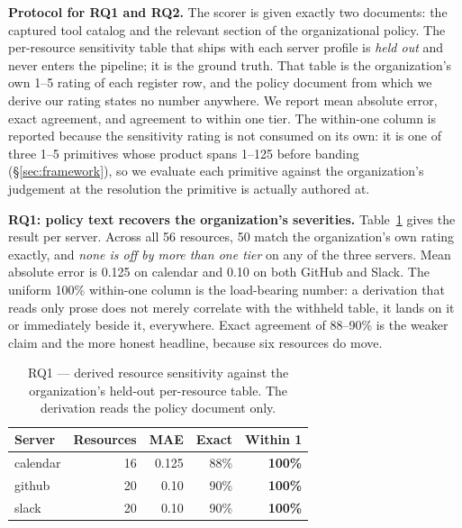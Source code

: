 \textbf{Protocol for RQ1 and RQ2.} The scorer is given exactly two documents:
the captured tool catalog and the relevant section of the organizational policy.
The per-resource sensitivity table that ships with each server profile is
\emph{held out} and never enters the pipeline; it is the ground truth. That
table is the organization's own 1--5 rating of each register row, and the policy
document from which we derive our rating states no number anywhere. We report
mean absolute error, exact agreement, and agreement to within one tier. The
within-one column is reported because the sensitivity rating is not consumed on
its own: it is one of three 1--5 primitives whose product spans 1--125 before
banding (\S\ref{sec:framework}), so we evaluate each primitive against the
organization's judgement at the resolution the primitive is actually
authored at.

\textbf{RQ1: policy text recovers the organization's severities.}
Table~\ref{tab:sensitivity} gives the result per server. Across all 56
resources, 50 match the organization's own rating exactly, and \emph{none is off
by more than one tier} on any of the three servers. Mean absolute error is 0.125
on calendar and 0.10 on both GitHub and Slack. The uniform 100\% within-one
column is the load-bearing number: a derivation that reads only prose does not
merely correlate with the withheld table, it lands on it or immediately beside
it, everywhere. Exact agreement of 88--90\% is the weaker claim and the more
honest headline, because six resources do move.

\begin{table}[t]
  \centering
  \small
  \caption{RQ1 --- derived resource sensitivity against the organization's
    held-out per-resource table. The derivation reads the policy document only.}
  \label{tab:sensitivity}
  \begin{tabular}{lrrrr}
    \toprule
    Server & Resources & MAE & Exact & Within 1 \\
    \midrule
    calendar & 16 & 0.125 & 88\% & \textbf{100\%} \\
    github   & 20 & 0.10  & 90\% & \textbf{100\%} \\
    slack    & 20 & 0.10  & 90\% & \textbf{100\%} \\
    \bottomrule
  \end{tabular}
\end{table}

